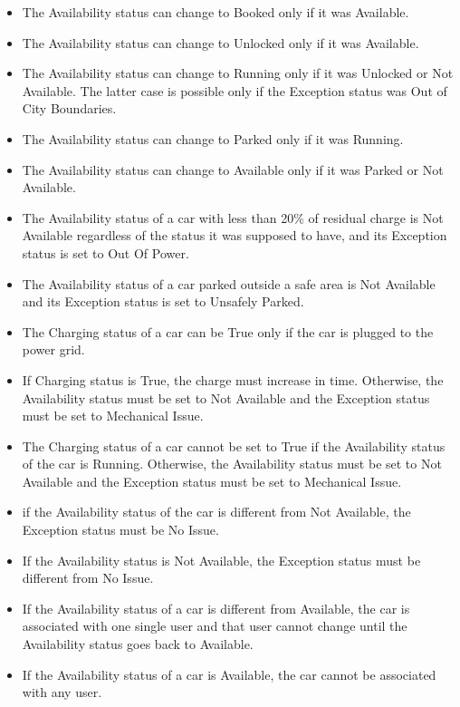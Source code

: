 \documentclass[11pt]{article} %
\begin{document}
\begin{itemize}
	\item The Availability status can change to Booked only if it was Available.
	\item The Availability status can change to Unlocked only if it was Available.
	\item The Availability status can change to Running only if it was Unlocked or Not Available. The latter case is possible only if the Exception status was Out of City Boundaries.
	\item The Availability status can change to Parked only if it was Running.
	\item  The Availability status can change to Available only if it was Parked or Not Available.
	\item The Availability status of a car with less than 20\% of residual charge is Not Available regardless of the status it was supposed to have, and its Exception status is set to Out Of Power.
	\item The Availability status of a car parked outside a safe area is Not Available and its Exception status is set to Unsafely Parked.
	\item The Charging status of a car can be True only if the car is plugged to the power grid.
	\item If Charging status is True, the charge must increase in time. Otherwise, the Availability status must be set to Not Available and the Exception status must be set to Mechanical Issue. 
	\item The Charging status of a car cannot be set to True if the Availability status of the car is Running. Otherwise, the Availability status must be set to Not Available and the Exception status must be set to Mechanical Issue. 
	\item if the Availability status of the car is different from Not Available, the Exception status must be No Issue.
	\item If the Availability status is Not Available, the Exception status must be different from No Issue.
	\item If the Availability status of a car is different from Available, the car is associated with one single user and that user cannot change until the Availability status goes back to Available.
	\item If the Availability status of a car is Available, the car cannot be associated with any user.
\end{itemize}
	
  
\end{document}
